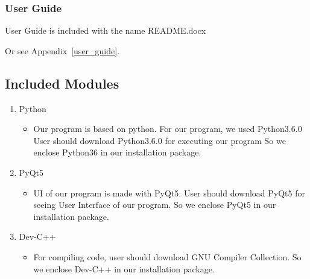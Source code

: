 \documentclass[conference]{IEEEtran}
\begin{document}
  \subsubsection{User Guide}
  User Guide is included with the name README.docx

  Or see Appendix~\ref{user_guide}.

\subsection{Included Modules}
\begin{enumerate}
\item{Python}
\begin{itemize}
\item Our program is based on python. For our program, we used Python3.6.0
User should download Python3.6.0 for executing our program
So we enclose Python36 in our installation package.
\end{itemize}
\item{PyQt5}
\begin{itemize}
\item UI of our program is made with PyQt5.
User should download PyQt5 for seeing User Interface of our program.
So we enclose PyQt5 in our installation package.
\end{itemize}
\item{Dev-C++}\\
\begin{itemize}
\item For compiling code, user should download GNU Compiler Collection.
So we enclose Dev-C++ in our installation package.
\end{itemize}
\end{enumerate}

\vfill

\onecolumn
\appendices
\end{document}
